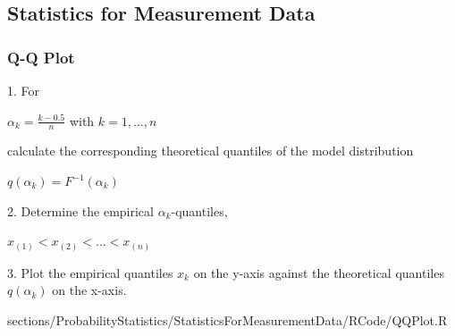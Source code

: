 \subsection{Statistics for Measurement Data}
	\subsubsection{Q-Q Plot}
		\RTheory
		{					
			1. For
			\begin{center}
				$\alpha_k=\frac{k-0.5}{n}$ with $k=1,...,n$\\
			\end{center}
			
			calculate the corresponding theoretical quantiles of the model distribution
			
			\begin{center}
				$q(\alpha_k)=F^{-1}(\alpha_k)$\\
			\end{center}				 
			
			2. Determine the empirical $\alpha_k$-quantiles,
			
			\begin{center}
				$x_{(1)}<x_{(2)}<...<x_{(n)}$\\
			\end{center}				 
			
			3. Plot the empirical quantiles $x_k$ on the y-axis against the theoretical quantiles 					$q(\alpha_k)$ on the x-axis.		 
		}
		{
			sections/ProbabilityStatistics/StatisticsForMeasurementData/RCode/QQPlot.R
		}
		
% 				

